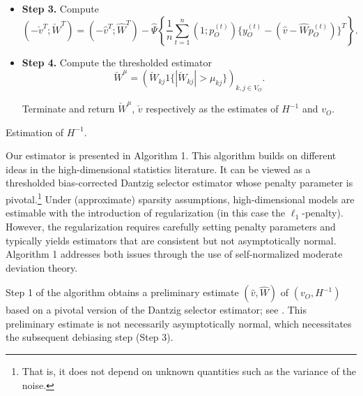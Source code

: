 \documentclass[opre,nonblindrev]{informs3} %
\begin{document}
\begin{algorithm}[tbp]
\begin{itemize}[leftmargin=*]
	
	\item[] {\bf Step 3.} Compute
	\begin{equation}\label{def:ortho:est}	
	(-\check v^T; \check W^T)  = (-\hat v^T; \hat W^T) -  \hat \Psi
	\left\{\frac{1}{n}\sum_{t=1}^n (1;p_O^{(t)}) \{y_O^{(t)}-(\hat v - \hat W p_O^{(t)})\}^T \right\}.
	\end{equation}	

\item[] {{\bf Step 4.} Compute the thresholded estimator
$$ \check W^\mu = ( \check W_{kj} 1\{|\check W_{kj}|> \mu_{kj} \})_{k,j\in V_O}. $$
	
	
		
		Terminate and return
		$\check W^\mu$, $\check{{v}}$ respectively as the
		estimates of $H^{-1}$ and ${v}_O$.}
		
	\end{itemize}
	\caption{Estimation  of $H^{-1}$.}
	\label{alg:Alg1}
\end{algorithm}


  Our estimator is presented in Algorithm 1.
This algorithm builds on different ideas in the high-dimensional statistics literature. 
It can be viewed as a thresholded bias-corrected Dantzig selector  estimator whose penalty parameter is pivotal.\footnote{That is, it does not depend on unknown quantities such as the variance of the noise.}
Under (approximate) sparsity assumptions, high-dimensional models are estimable with the introduction of regularization (in this case the $\ell_1$-penalty). 
However, the regularization requires carefully setting penalty parameters and typically yields estimators that are consistent but not asymptotically normal. Algorithm 1 addresses both issues through the use of self-normalized moderate deviation theory.


 Step 1 of the algorithm obtains a preliminary estimate $(\hat v,\hat W)$ of $(v_O,H^{-1})$ based on a pivotal version of the Dantzig selector estimator; see  \cite{CandesTao2007,BickelRitovTsybakov2009,belloni2017pivotal}.
This preliminary estimate is not necessarily asymptotically normal, which necessitates the subsequent debiasing step (Step 3).
\end{document}
